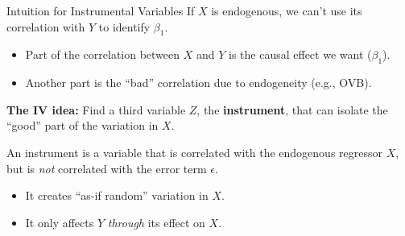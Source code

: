 \documentclass[
  ignorenonframetext,
  aspectratio=169]{beamer}
\providecommand{\tightlist}{%
  \setlength{\itemsep}{0pt}\setlength{\parskip}{0pt}}
\begin{document}
\begin{frame}{Intuition for Instrumental Variables}
\label{intuition-for-instrumental-variables}
If \(X\) is endogenous, we can't use its correlation with \(Y\) to
identify \(\beta_1\).

\begin{itemize}
\tightlist
\item
  Part of the correlation between \(X\) and \(Y\) is the causal effect
  we want (\(\beta_1\)).
\item
  Another part is the ``bad'' correlation due to endogeneity (e.g.,
  OVB).
\end{itemize}

\textbf{The IV idea:} Find a third variable \(Z\), the
\textbf{instrument}, that can isolate the ``good'' part of the variation
in \(X\).

An instrument is a variable that is correlated with the endogenous
regressor \(X\), but is \textit{not} correlated with the error term
\(\epsilon\).

\begin{itemize}
\tightlist
\item
  It creates ``as-if random'' variation in \(X\).
\item
  It only affects \(Y\) \textit{through} its effect on \(X\).
\end{itemize}
\end{frame}
\end{document}
